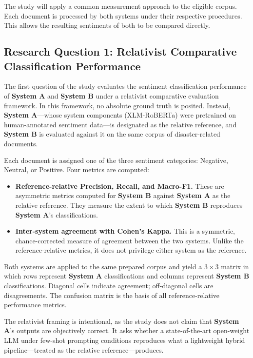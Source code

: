 \documentclass[12pt,a4paper]{report}
\newcommand{\sysA}{\textbf{System A}}
\newcommand{\sysB}{\textbf{System B}}
\newcommand{\xlmr}{XLM-RoBERTa}
\begin{document}
The study will apply a common measurement approach to the eligible corpus. Each
document is processed by both systems under their respective procedures. This
allows the resulting sentiments of both to be compared directly.

\subsection{Research Question 1: Relativist Comparative Classification
Performance}

The first question of the study evaluates the sentiment classification
performance of \sysA{} and \sysB{} under a relativist comparative evaluation
framework. In this framework, no absolute ground truth is posited. Instead,
\sysA---whose system components (\xlmr) were pretrained on human-annotated
sentiment data---is designated as the relative reference, and \sysB{} is
evaluated against it on the same corpus of disaster-related documents.

Each document is assigned one of the three sentiment categories: Negative,
Neutral, or Positive. Four metrics are computed:

\begin{itemize}
  \item \textbf{Reference-relative Precision, Recall, and Macro-F1.} These are
  asymmetric metrics computed for \sysB{} against \sysA{} as the relative
  reference. They measure the extent to which \sysB{} reproduces \sysA's
  classifications.
  \item \textbf{Inter-system agreement with Cohen's Kappa.} This is a
  symmetric, chance-corrected measure of agreement between the two systems.
  Unlike the reference-relative metrics, it does not privilege either system as
  the reference.
\end{itemize}

Both systems are applied to the same prepared corpus and yield a $3 \times 3$
matrix in which rows represent \sysA{} classifications and columns represent
\sysB{} classifications. Diagonal cells indicate agreement; off-diagonal cells
are disagreements. The confusion matrix is the basis of all reference-relative
performance metrics.

The relativist framing is intentional, as the study does not claim that
\sysA's outputs are objectively correct. It asks whether a state-of-the-art
open-weight LLM under few-shot prompting conditions reproduces what a
lightweight hybrid pipeline---treated as the relative reference---produces.
\end{document}
